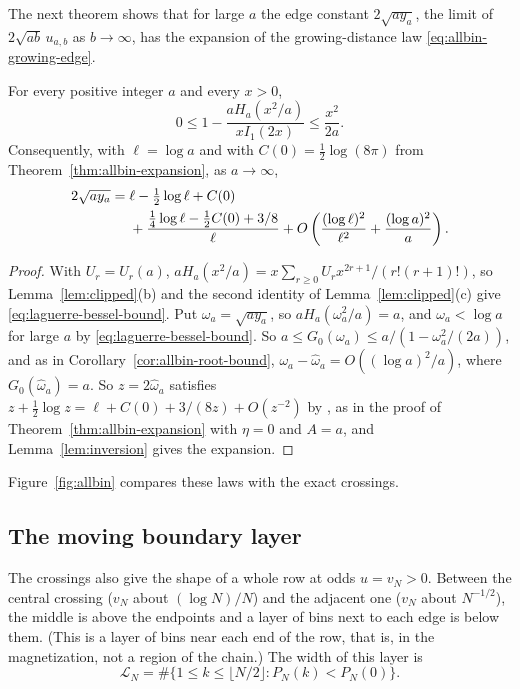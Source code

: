 The next theorem shows that for large $a$ the edge constant $2\sqrt{ay_a}$,
the limit of $2\sqrt{ab}\,u_{a,b}$ as $b\to\infty$, has the expansion of the
growing-distance law \eqref{eq:allbin-growing-edge}.

\begin{theorem}\label{thm:edge-matching}
For every positive integer $a$ and every $x>0$,
\begin{equation}\label{eq:laguerre-bessel-bound}
 0\le1-\frac{aH_a(x^2/a)}{xI_1(2x)}\le\frac{x^2}{2a}.
\end{equation}
Consequently, with $\ell=\log a$ and with $C(0)=\tfrac12\log(8\pi)$ from
Theorem~\ref{thm:allbin-expansion}, as $a\to\infty$,
\begin{align}
 2\sqrt{a y_a}
 ={}&\ell-\tfrac12\log\ell+C(0)\notag\\
 &+\frac{\tfrac14\log\ell-\tfrac12C(0)+3/8}{\ell}
 +O\left(\frac{(\log\ell)^2}{\ell^2}+\frac{(\log a)^2}{a}\right).
 \label{eq:edge-matching-expansion}
\end{align}
\end{theorem}

\begin{proof}
With $U_r=U_r(a)$, $aH_a(x^2/a)=x\sum_{r\ge0}U_rx^{2r+1}/(r!(r+1)!)$, so
Lemma~\ref{lem:clipped}(b) and the second identity of
Lemma~\ref{lem:clipped}(c) give \eqref{eq:laguerre-bessel-bound}. Put
$\omega_a=\sqrt{ay_a}$, so $aH_a(\omega_a^2/a)=a$, and $\omega_a<\log a$ for large $a$ by
\eqref{eq:laguerre-bessel-bound}. So $a\le G_0(\omega_a)\le a/(1-\omega_a^2/(2a))$, and
as in Corollary~\ref{cor:allbin-root-bound}, $\omega_a-\hat\omega_a=O((\log a)^2/a)$, where
$G_0(\hat\omega_a)=a$. So $z=2\hat\omega_a$ satisfies
$z+\frac12\log z=\ell+C(0)+3/(8z)+O(z^{-2})$ by \cite[Eq.~10.40.1]{dlmf}, as in
the proof of Theorem~\ref{thm:allbin-expansion} with $\eta=0$ and $A=a$, and
Lemma~\ref{lem:inversion} gives the expansion.
\end{proof}

Figure~\ref{fig:allbin} compares these laws with the exact crossings.

\subsection{The moving boundary layer}\label{sec:allbin-layer}

The crossings also give the shape of a whole row at odds $u=v_N>0$. Between
the central crossing ($v_N$ about $(\log N)/N$) and the adjacent one ($v_N$
about $N^{-1/2}$), the middle is above the endpoints and a layer of bins next
to each edge is below them. (This is a layer of bins near each end of the
row, that is, in the magnetization, not a region of the chain.) The width of
this layer is
\[
 \mathcal L_N=\#\{1\le k\le\lfloor N/2\rfloor:P_N(k)<P_N(0)\}.
\]

